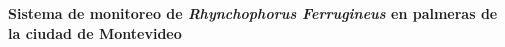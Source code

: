 \begin{titlepage}

    \begin{flushright}
        \setlength{\rightskip}{-2cm} %
        \vspace*{7.5cm} %

        {\bfseries\fontsize{33pt}{40pt}\selectfont
        Sistema de monitoreo de \textit{Rhynchophorus Ferrugineus} en palmeras de la ciudad de Montevideo} \\[1.5cm]


\end{flushright}
\end{titlepage}
